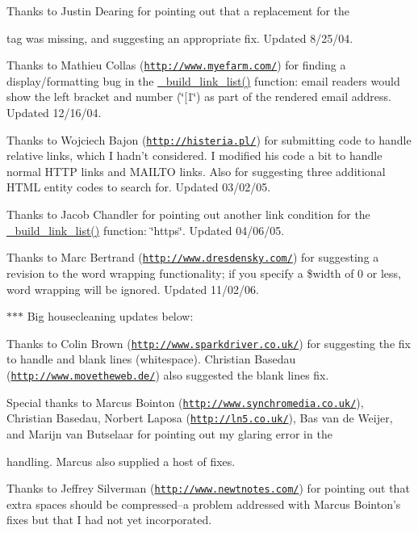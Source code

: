Thanks to Justin Dearing for pointing out that a replacement for the 

tag was missing, and suggesting an appropriate fix. Updated 8/25/04.

Thanks to Mathieu Collas (\href{http://www.myefarm.com/}{\tt http\-://www.\-myefarm.\-com/}) for finding a display/formatting bug in the \hyperlink{classhtml2text_a82ac6258106b2d8ad380dce11d9dddef}{\-\_\-build\-\_\-link\-\_\-list()} function\-: email readers would show the left bracket and number (\char`\"{}\mbox{[}1\char`\"{}) as part of the rendered email address. Updated 12/16/04.

Thanks to Wojciech Bajon (\href{http://histeria.pl/}{\tt http\-://histeria.\-pl/}) for submitting code to handle relative links, which I hadn't considered. I modified his code a bit to handle normal H\-T\-T\-P links and M\-A\-I\-L\-T\-O links. Also for suggesting three additional H\-T\-M\-L entity codes to search for. Updated 03/02/05.

Thanks to Jacob Chandler for pointing out another link condition for the \hyperlink{classhtml2text_a82ac6258106b2d8ad380dce11d9dddef}{\-\_\-build\-\_\-link\-\_\-list()} function\-: \char`\"{}https\char`\"{}. Updated 04/06/05.

Thanks to Marc Bertrand (\href{http://www.dresdensky.com/}{\tt http\-://www.\-dresdensky.\-com/}) for suggesting a revision to the word wrapping functionality; if you specify a \$width of 0 or less, word wrapping will be ignored. Updated 11/02/06.

$\ast$$\ast$$\ast$ Big housecleaning updates below\-:

Thanks to Colin Brown (\href{http://www.sparkdriver.co.uk/}{\tt http\-://www.\-sparkdriver.\-co.\-uk/}) for suggesting the fix to handle  and blank lines (whitespace). Christian Basedau (\href{http://www.movetheweb.de/}{\tt http\-://www.\-movetheweb.\-de/}) also suggested the blank lines fix.

Special thanks to Marcus Bointon (\href{http://www.synchromedia.co.uk/}{\tt http\-://www.\-synchromedia.\-co.\-uk/}), Christian Basedau, Norbert Laposa (\href{http://ln5.co.uk/}{\tt http\-://ln5.\-co.\-uk/}), Bas van de Weijer, and Marijn van Butselaar for pointing out my glaring error in the 

handling. Marcus also supplied a host of fixes.

Thanks to Jeffrey Silverman (\href{http://www.newtnotes.com/}{\tt http\-://www.\-newtnotes.\-com/}) for pointing out that extra spaces should be compressed--a problem addressed with Marcus Bointon's fixes but that I had not yet incorporated.

